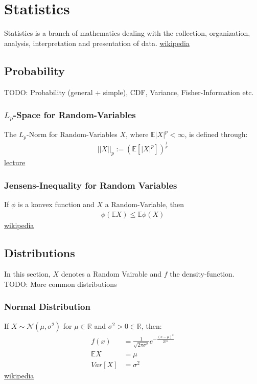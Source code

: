 \chapter{Statistics}
Statistics is a branch of mathematics dealing with the collection, organization, analysis, interpretation and presentation of data.
\href{https://en.wikipedia.org/wiki/Statistics}{wikipedia}

\section{Probability}
TODO: Probability (general + simple), CDF, Variance, Fisher-Information etc.
\subsection{$L_p$-Space for Random-Variables}
The $L_p$-Norm for Random-Variables $X$, where $\mathbb{E}|X|^p < \infty$, is defined through:
\begin{align*}
	||X||_p:=(\mathbb{E}[|X|^p])^{\frac{1}{p}}
\end{align*}
\href{http://www2.stat.duke.edu/courses/Fall18/sta711/lec/wk-05.pdf}{lecture}

\subsection{Jensens-Inequality for Random Variables}
If $\phi$ is a konvex function and $X$ a Random-Variable, then
\begin{align*}
	\phi(\mathbb{E}X) \leq \mathbb{E}\phi(X)
\end{align*}
\href{https://en.wikipedia.org/wiki/Jensen%27s_inequality}{wikipedia}

\section{Distributions}
In this section, $X$ denotes a Random Vairable and $f$ the density-function.\\
TODO: More common distributions
\subsection{Normal Distribution}
If $X \sim {\mathcal {N}}(\mu ,\sigma ^{2})$ for ${\displaystyle \mu \in \mathbb {R}}$ and $\sigma ^{2} > 0 \in \mathbb {R}$, then:
\begin{align*}
	f(x) &= {\displaystyle {\frac {1}{\sqrt {2\pi \sigma ^{2}}}}e^{-{\frac {(x-\mu )^{2}}{2\sigma ^{2}}}}}\\
	\mathbb{E}X &= \mu \\
	Var[X] &= \sigma^2
\end{align*}
\href{https://en.wikipedia.org/wiki/Normal_distribution}{wikipedia}

